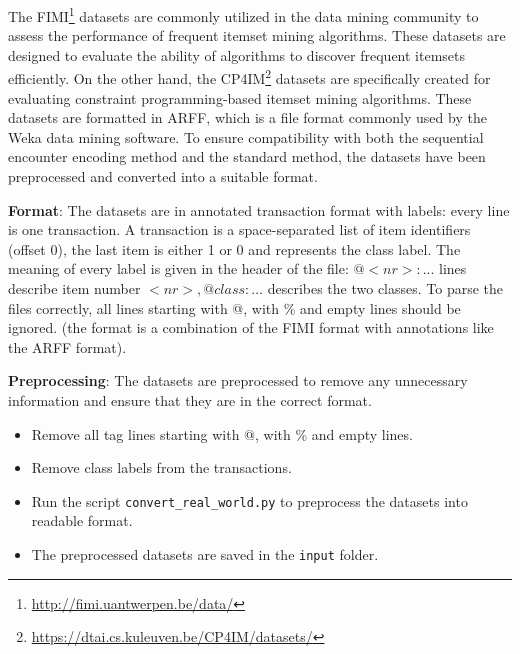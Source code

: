 The FIMI\footnote{\url{http://fimi.uantwerpen.be/data/}} datasets are commonly utilized in the data mining community to assess the performance of frequent itemset mining algorithms.
These datasets are designed to evaluate the ability of algorithms to discover frequent itemsets efficiently.
On the other hand, the CP4IM\footnote{\url{https://dtai.cs.kuleuven.be/CP4IM/datasets/}} datasets are specifically created for evaluating constraint programming-based itemset mining algorithms.
These datasets are formatted in ARFF, which is a file format commonly used by the Weka data mining software.
To ensure compatibility with both the sequential encounter encoding method and the standard method, the datasets have been preprocessed and converted into a suitable format.

\textbf{Format}: The datasets are in annotated transaction format with labels: every line is one transaction.
A transaction is a space-separated list of item identifiers (offset 0), the last item is either 1 or 0 and represents the class label.
The meaning of every label is given in the header of the file: $@<nr>: ...$ lines describe item number $<nr>, @class: ...$ describes the two classes.
To parse the files correctly, all lines starting with @, with \% and empty lines should be ignored. (the format is a combination of the FIMI format with annotations like the ARFF format).

\textbf{Preprocessing}: The datasets are preprocessed to remove any unnecessary information and ensure that they are in the correct format.
\begin{itemize}
    \item Remove all tag lines starting with @, with \% and empty lines.
    \item Remove class labels from the transactions.
    \item Run the script \texttt{convert\_real\_world.py} to preprocess the datasets into readable format.
    \item The preprocessed datasets are saved in the \texttt{input} folder.
\end{itemize}
